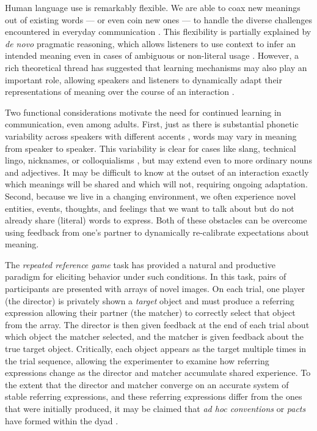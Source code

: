 \documentclass[alpha-refs]{wiley-article}
\begin{document}
Human language use is remarkably flexible. 
We are able to coax new meanings out of existing words --- or even coin new ones --- to handle the diverse challenges encountered in everyday communication \citep{Clark83_NonceSense,davidson_nice_1986}.
This flexibility is partially explained by \emph{de novo} pragmatic reasoning, which allows listeners to use context to infer an intended meaning even in cases of ambiguous or non-literal usage \citep{LascaridesCopestake98_PragmaticsWordMeaning,Glucksberg01_FigurativeLanguage,GoodmanFrank16_RSATiCS}.
However, a rich theoretical thread has suggested that learning mechanisms may also play an important role, allowing speakers and listeners to dynamically adapt their representations of meaning over the course of an interaction \citep{BrennanClark96_ConceptualPactsConversation,pickering2004toward,delaney2019neural}.

Two functional considerations motivate the need for continued learning in communication, even among adults.
First, just as there is substantial phonetic variability across speakers with different accents \citep{kleinschmidt2019structure}, words may vary in meaning from speaker to speaker. 
This variability is clear for cases like slang, technical lingo, nicknames, or colloquialisms \citep[e.g.][]{Clark98_CommunalLexicons}, but may extend even to more ordinary nouns and adjectives. 
It may be difficult to know at the outset of an interaction exactly which meanings will be shared and which will not, requiring ongoing adaptation.
Second, because we live in a changing environment, we often experience novel entities, events, thoughts, and feelings that we want to talk about but do not already share (literal) words to express.
Both of these obstacles can be overcome using feedback from one's partner to dynamically re-calibrate expectations about meaning.

The \emph{repeated reference game} task has provided a natural and productive paradigm for eliciting behavior under such conditions.
In this task, pairs of participants are presented with arrays of novel images. 
On each trial, one player (the director) is privately shown a \emph{target} object and must produce a referring expression allowing their partner (the matcher) to correctly select that object from the array.
The director is then given feedback at the end of each trial about which object the matcher selected, and the matcher is given feedback about the true target object. 
Critically, each object appears as the target multiple times in the trial sequence, allowing the experimenter to examine how referring expressions change as the director and matcher accumulate shared experience.
To the extent that the director and matcher converge on an accurate system of stable referring expressions, and these referring expressions differ from the ones that were initially produced, it may be claimed that \emph{ad hoc conventions} or \emph{pacts} have formed within the dyad \citep{hawkins2018emergence}.
\end{document}
